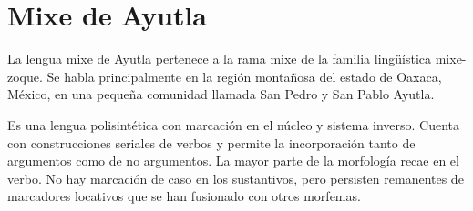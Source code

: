 \section*{Mixe de Ayutla}

\noindent La lengua mixe de Ayutla pertenece a la rama mixe de la familia lingüística mixe-zoque. Se habla principalmente en la región montañosa del estado de Oaxaca, México, en una pequeña comunidad llamada San Pedro y San Pablo Ayutla. 

Es una lengua polisintética con marcación en el núcleo y sistema inverso. Cuenta con construcciones seriales de verbos y permite la incorporación tanto de argumentos como de no argumentos. La mayor parte de la morfología recae en el verbo. No hay marcación de caso en los sustantivos, pero persisten remanentes de marcadores locativos que se han fusionado con otros morfemas. \vspace{0.5cm}



